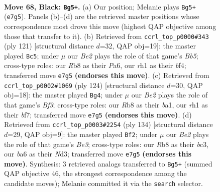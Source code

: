 \documentclass[11pt]{article}
\begin{document}
\clearpage

\begin{figure}[p]\centering
\begin{subfigure}{0.46\textwidth}\centering
\resizebox{\linewidth}{!}{%
\newchessgame
\chessboard[
  setfen={1r6/4b1k1/B2p3p/B3p3/n3P2p/4KP2/8/7R b - - 6 68},
  showmover=false,
  pgfstyle=straightmove, color=movearrow, markmove={e7-g5}
]}
\caption{}
\end{subfigure}\hfill
\begin{subfigure}{0.46\textwidth}\centering
\resizebox{\linewidth}{!}{%
\newchessgame
\chessboard[
  setfen={8/5k2/p2p2p1/3P1pP1/1b3B1P/7K/P7/8 b - - 24 61},
  showmover=false,
  pgfstyle=straightmove, color=movearrow, markmove={b4-c5}
]}
\caption{}
\end{subfigure}
\\[4pt]
\begin{subfigure}{0.46\textwidth}\centering
\resizebox{\linewidth}{!}{%
\newchessgame
\chessboard[
  setfen={7k/5bp1/7p/7P/5P2/3K1BP1/8/b1B5 w - - 11 63},
  showmover=false,
  pgfstyle=straightmove, color=movearrow, markmove={f3-g4}
]}
\caption{}
\end{subfigure}\hfill
\begin{subfigure}{0.46\textwidth}\centering
\resizebox{\linewidth}{!}{%
\newchessgame
\chessboard[
  setfen={8/6k1/5pp1/7p/4rP1P/1BbNB3/6PK/8 w - - 3 68},
  showmover=false,
  pgfstyle=straightmove, color=movearrow, markmove={e3-f2}
]}
\caption{}
\end{subfigure}
\caption{\textbf{Move 68, Black: \texttt{Bg5+}.} (a) Our position; Melanie plays \texttt{Bg5+} (\texttt{e7g5}). Panels (b)--(d) are the retrieved master positions whose correspondence most drove this move (highest QAP objective among those that transfer to it). (b) Retrieved from \texttt{ccrl\_top\_p0000\#343} (ply 121) [structural distance $d$=32, QAP obj=19]: the master played \texttt{Bc5}; under $\mu$ our \emph{Be2} plays the role of that game's \emph{Bb5}; cross-type roles: our \emph{R}b8 as their \emph{P}a6, our \emph{r}h1 as their \emph{b}f4; transferred move \texttt{e7g5} \textbf{(endorses this move)}. (c) Retrieved from \texttt{ccrl\_top\_p0002\#1069} (ply 124) [structural distance $d$=30, QAP obj=18]: the master played \texttt{Bg4}; under $\mu$ our \emph{Be2} plays the role of that game's \emph{Bf3}; cross-type roles: our \emph{R}b8 as their \emph{b}a1, our \emph{r}h1 as their \emph{b}f7; transferred move \texttt{e7g5} \textbf{(endorses this move)}. (d) Retrieved from \texttt{ccrl\_top\_p0003\#2254} (ply 134) [structural distance $d$=29, QAP obj=9]: the master played \texttt{Bf2}; under $\mu$ our \emph{Be2} plays the role of that game's \emph{Be3}; cross-type roles: our \emph{R}b8 as their \emph{b}c3, our \emph{b}a6 as their \emph{N}d3; transferred move \texttt{e7g5} \textbf{(endorses this move)}. Synthesis: 3 retrieved analogs transferred to \texttt{Bg5+} (summed QAP objective 46, the strongest correspondence among the candidate moves); Melanie committed it via the \texttt{search} selector.}
\label{fig:thought-m135}
\end{figure}
\end{document}

